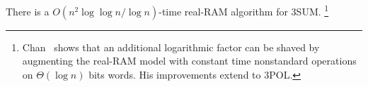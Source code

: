 \begin{theorem}
There is a $O(n^2 \log \log n / \log n)$-time real-RAM algorithm
for 3SUM\@.%
\footnote{Chan~\cite{Ch18} shows that an additional logarithmic factor can be shaved
by augmenting the real-RAM model with constant time nonstandard operations on
$\Theta(\log n)$ bits words. His improvements extend to 3POL.}
\end{theorem}
